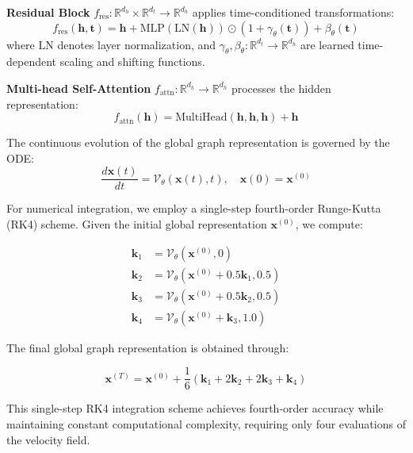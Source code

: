 \documentclass{article}
\begin{document}
\textbf{Residual Block} $f_\text{res}: \mathbb{R}^{d_h} \times \mathbb{R}^{d_t} \rightarrow \mathbb{R}^{d_h}$ applies time-conditioned transformations:
\begin{equation}
f_\text{res}(\mathbf{h}, \mathbf{t}) = \mathbf{h} + \text{MLP}(\text{LN}(\mathbf{h})) \odot (1 + \gamma_\theta(\mathbf{t})) + \beta_\theta(\mathbf{t})
\end{equation}
where $\text{LN}$ denotes layer normalization, and $\gamma_\theta, \beta_\theta: \mathbb{R}^{d_t} \rightarrow \mathbb{R}^{d_h}$ are learned time-dependent scaling and shifting functions.

\textbf{Multi-head Self-Attention} $f_\text{attn}: \mathbb{R}^{d_h} \rightarrow \mathbb{R}^{d_h}$ processes the hidden representation:
\begin{equation}
f_\text{attn}(\mathbf{h}) = \text{MultiHead}(\mathbf{h}, \mathbf{h}, \mathbf{h}) + \mathbf{h}
\end{equation}

The continuous evolution of the global graph representation is governed by the ODE:
\begin{equation}
\frac{d\mathbf{x}(t)}{dt} = \mathcal{V}_\theta(\mathbf{x}(t), t), \quad \mathbf{x}(0) = \mathbf{x}^{(0)}
\end{equation}

For numerical integration, we employ a single-step fourth-order Runge-Kutta (RK4) scheme. 
Given the initial global representation $\mathbf{x}^{(0)}$, we compute:

\begin{align}
\mathbf{k}_1 &= \mathcal{V}_\theta(\mathbf{x}^{(0)}, 0) \\
\mathbf{k}_2 &= \mathcal{V}_\theta(\mathbf{x}^{(0)} + 0.5\mathbf{k}_1, 0.5) \\
\mathbf{k}_3 &= \mathcal{V}_\theta(\mathbf{x}^{(0)} + 0.5\mathbf{k}_2, 0.5) \\
\mathbf{k}_4 &= \mathcal{V}_\theta(\mathbf{x}^{(0)} + \mathbf{k}_3, 1.0)
\end{align}

The final global graph representation is obtained through:

\begin{equation}
\mathbf{x}^{(T)} = \mathbf{x}^{(0)} + \frac{1}{6}(\mathbf{k}_1 + 2\mathbf{k}_2 + 2\mathbf{k}_3 + \mathbf{k}_4)
\end{equation}

This single-step RK4 integration scheme achieves fourth-order accuracy while maintaining constant computational complexity, requiring only four evaluations of the velocity field.
\end{document}
